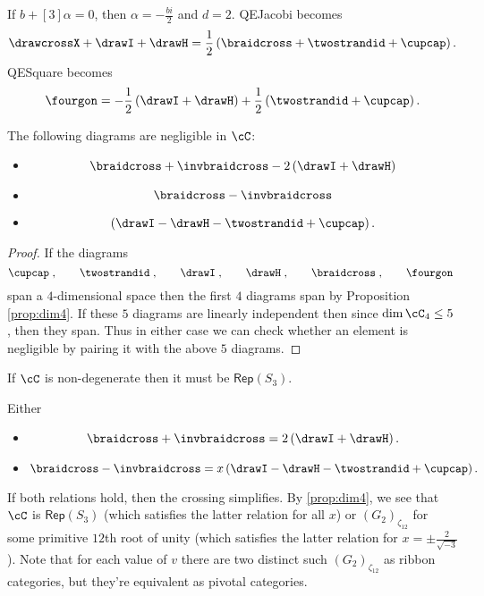 \documentclass[12pt]{amsart}
\begin{document}
If $b+[3]\alpha = 0$, then $\alpha = -\frac{bi}{2}$ and $d = 2$.  QEJacobi becomes
$$\drawcrossX + \drawI + \drawH = \frac{1}{2} \left(\braidcross + \twostrandid + \cupcap \right).$$
QESquare becomes
$$\fourgon = -\frac{1}{2} \left(\drawI + \drawH \right) + \frac{1}{2} \left(\twostrandid + \cupcap\right).$$

\begin{lemma}
The following diagrams are negligible in $\cC$:
\begin{itemize}
\item $$\braidcross + \invbraidcross - 2 \left(\drawI + \drawH \right)$$
\item $$\braidcross - \invbraidcross$$
\item $$\left(\drawI - \drawH - \twostrandid + \cupcap\right).$$
\end{itemize}
\end{lemma}
\begin{proof}
If the diagrams
  \[
  \cupcap\;,\qquad\twostrandid\;,
    \qquad\drawI\;,\qquad\drawH\;,\qquad\braidcross\;,\qquad\fourgon\;
   \]
 span a $4$-dimensional space then the first $4$ diagrams span by Proposition \ref{prop:dim4}.  If these $5$ diagrams are linearly independent then since $\dim \cC_4 \leq 5$, then they span.  Thus in either case we can check whether an element is negligible by pairing it with the above $5$ diagrams.
\end{proof}

\begin{corollary}
If $\cC$ is non-degenerate then it must be $\mathsf{Rep}(S_3)$.
\end{corollary}

\begin{corollary}
Either
\begin{itemize}
\item $$\braidcross + \invbraidcross = 2 \left(\drawI + \drawH \right).$$
\item $$\braidcross - \invbraidcross = x \left(\drawI - \drawH - \twostrandid + \cupcap\right).$$
\end{itemize}
\end{corollary}

If both relations hold, then the crossing simplifies.  By \ref{prop:dim4}, we
see that $\cC$ is $\mathsf{Rep}(S_3)$ (which satisfies the latter relation for
all $x$) or $(G_2)_{\zeta_{12}}$ for some primitive $12$th root of unity
(which satisfies the latter relation for $x = \pm \frac{2}{\sqrt{-3}}$). Note
that for each value of $v$ there are two distinct such $(G_2)_{\zeta_{12}}$ as
ribbon categories, but they're equivalent as pivotal categories.
\end{document}
